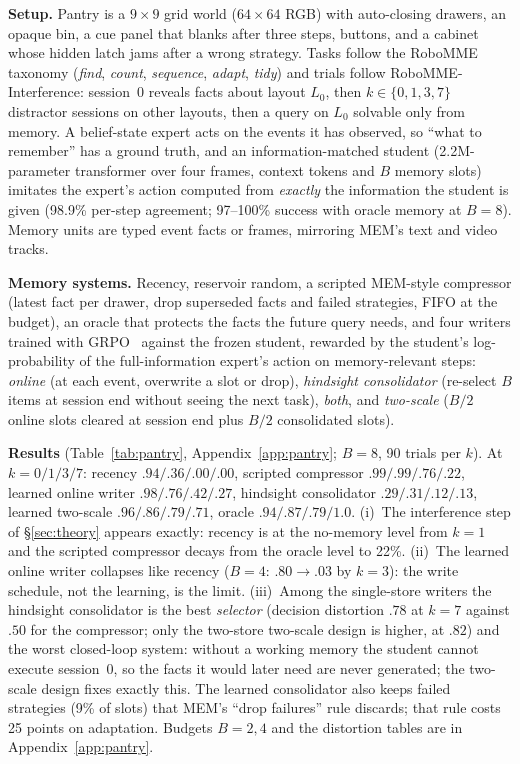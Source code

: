 \documentclass{article}
\begin{document}
\textbf{Setup.} Pantry is a $9{\times}9$ grid world ($64{\times}64$ RGB) with auto-closing drawers, an opaque bin, a cue panel that blanks after three steps, buttons, and a cabinet whose hidden latch jams after a wrong strategy. Tasks follow the RoboMME taxonomy (\emph{find}, \emph{count}, \emph{sequence}, \emph{adapt}, \emph{tidy}) and trials follow RoboMME-Interference: session~0 reveals facts about layout $L_0$, then $k\in\{0,1,3,7\}$ distractor sessions on other layouts, then a query on $L_0$ solvable only from memory. A belief-state expert acts on the events it has observed, so ``what to remember'' has a ground truth, and an information-matched student (2.2M-parameter transformer over four frames, context tokens and $B$ memory slots) imitates the expert's action computed from \emph{exactly} the information the student is given (98.9\% per-step agreement; 97--100\% success with oracle memory at $B{=}8$). Memory units are typed event facts or frames, mirroring MEM's text and video tracks.

\textbf{Memory systems.} Recency, reservoir random, a scripted MEM-style compressor (latest fact per drawer, drop superseded facts and failed strategies, FIFO at the budget), an oracle that protects the facts the future query needs, and four writers trained with GRPO~\cite{grpo} against the frozen student, rewarded by the student's log-probability of the full-information expert's action on memory-relevant steps: \emph{online} (at each event, overwrite a slot or drop), \emph{hindsight consolidator} (re-select $B$ items at session end without seeing the next task), \emph{both}, and \emph{two-scale} ($B/2$ online slots cleared at session end plus $B/2$ consolidated slots).


\textbf{Results} (Table~\ref{tab:pantry}, Appendix~\ref{app:pantry}; $B{=}8$, 90 trials per $k$). At $k=0/1/3/7$: recency $.94/.36/.00/.00$, scripted compressor $.99/.99/.76/.22$, learned online writer $.98/.76/.42/.27$, hindsight consolidator $.29/.31/.12/.13$, learned two-scale $.96/.86/.79/.71$, oracle $.94/.87/.79/1.0$. (i)~The interference step of \S\ref{sec:theory} appears exactly: recency is at the no-memory level from $k{=}1$ and the scripted compressor decays from the oracle level to 22\%. (ii)~The learned online writer collapses like recency ($B{=}4$: $.80\to.03$ by $k{=}3$): the write schedule, not the learning, is the limit. (iii)~Among the single-store writers the hindsight consolidator is the best \emph{selector} (decision distortion $.78$ at $k{=}7$ against $.50$ for the compressor; only the two-store two-scale design is higher, at $.82$) and the worst closed-loop system: without a working memory the student cannot execute session~0, so the facts it would later need are never generated; the two-scale design fixes exactly this. The learned consolidator also keeps failed strategies (9\% of slots) that MEM's ``drop failures'' rule discards; that rule costs 25 points on adaptation. Budgets $B{=}2,4$ and the distortion tables are in Appendix~\ref{app:pantry}.
\end{document}
